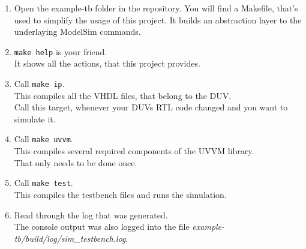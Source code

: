 \begin{enumerate}
      \item Open the example-tb folder in the repository.
            You will find a Makefile, that's used to simplify the usage of this project. It builds an abstraction layer to the underlaying ModelSim commands.
      \item \texttt{make help} is your friend. \\
            It shows all the actions, that this project provides.
      \item Call \texttt{make ip}. \\
            This compiles all the VHDL files, that belong to the DUV.\\
            Call this target, whenever your DUVs RTL code changed and you want to simulate it.
      \item Call \texttt{make uvvm}. \\
            This compiles several required components of the UVVM library. \\
            That only needs to be done once.
      \item Call \texttt{make test}. \\
            This compiles the testbench files and runs the simulation.
      \item Read through the log that was generated.\\
            The console output was also logged into the file \textit{example-tb/build/log/sim\_testbench.log}.
\end{enumerate}
